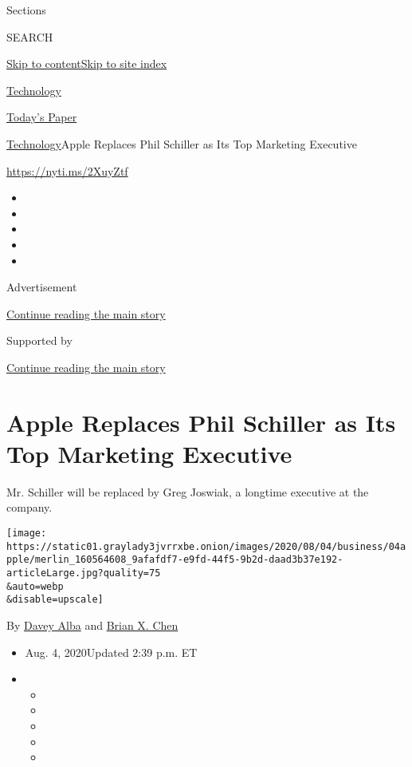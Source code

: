 Sections

SEARCH

\protect\hyperlink{site-content}{Skip to
content}\protect\hyperlink{site-index}{Skip to site index}

\href{https://www.nytimes3xbfgragh.onion/section/technology}{Technology}

\href{https://myaccount.nytimes3xbfgragh.onion/auth/login?response_type=cookie\&client_id=vi}{}

\href{https://www.nytimes3xbfgragh.onion/section/todayspaper}{Today's
Paper}

\href{/section/technology}{Technology}\textbar{}Apple Replaces Phil
Schiller as Its Top Marketing Executive

\url{https://nyti.ms/2XuyZtf}

\begin{itemize}
\item
\item
\item
\item
\item
\end{itemize}

Advertisement

\protect\hyperlink{after-top}{Continue reading the main story}

Supported by

\protect\hyperlink{after-sponsor}{Continue reading the main story}

\hypertarget{apple-replaces-phil-schiller-as-its-top-marketing-executive}{%
\section{Apple Replaces Phil Schiller as Its Top Marketing
Executive}\label{apple-replaces-phil-schiller-as-its-top-marketing-executive}}

Mr. Schiller will be replaced by Greg Joswiak, a longtime executive at
the company.

\texttt{[image: https://static01.graylady3jvrrxbe.onion/images/2020/08/04/business/04apple/merlin\_160564608\_9afafdf7-e9fd-44f5-9b2d-daad3b37e192-articleLarge.jpg?quality=75\\\&auto=webp\\\&disable=upscale]}

By \href{https://www.nytimes3xbfgragh.onion/by/davey-alba}{Davey Alba}
and \href{https://www.nytimes3xbfgragh.onion/by/brian-x-chen}{Brian X.
Chen}

\begin{itemize}
\item
  Aug. 4, 2020Updated 2:39 p.m. ET
\item
  \begin{itemize}
  \item
  \item
  \item
  \item
  \item
  \end{itemize}
\end{itemize}

